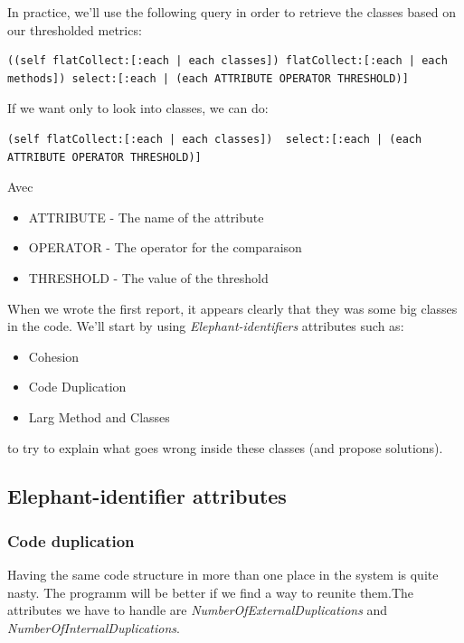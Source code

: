 \documentclass[11pt,a4paper]{article}
\begin{document}
In practice, we'll use the following query in order to retrieve the classes based on our thresholded metrics:\\

\begin{lstlisting}
((self flatCollect:[:each | each classes]) flatCollect:[:each | each methods]) select:[:each | (each ATTRIBUTE OPERATOR THRESHOLD)] 
\end{lstlisting}

If we want only to look into classes, we can do:\\
\begin{lstlisting}
(self flatCollect:[:each | each classes])  select:[:each | (each ATTRIBUTE OPERATOR THRESHOLD)]
\end{lstlisting}
Avec
\begin{itemize}
\item ATTRIBUTE - The name of the attribute
\item OPERATOR - The operator for the comparaison
\item THRESHOLD - The value of the threshold
 \end{itemize}

When we wrote the first report, it appears clearly that they was some big classes in the code. We'll start by using \textit{Elephant-identifiers} attributes such as:
\begin{itemize}
\item Cohesion
\item Code Duplication
\item Larg Method and Classes
\end{itemize}

to try to explain what goes wrong inside these classes (and propose solutions).  
\subsection{Elephant-identifier attributes}
\subsubsection{Code duplication}
Having the same code structure in more than one place in the system is quite nasty. The programm will be better if we find a way to reunite them.The attributes we have to handle are \textit{NumberOfExternalDuplications} and \textit{NumberOfInternalDuplications}.\\
\end{document}

